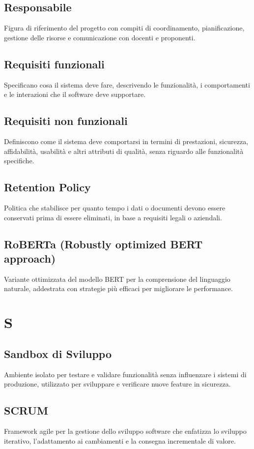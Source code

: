 \documentclass[a4paper,11pt]{article}
\begin{document}
\subsection{Responsabile}
Figura di riferimento del progetto con compiti di coordinamento, pianificazione, gestione delle risorse e comunicazione con docenti e proponenti.

\subsection{Requisiti funzionali}
Specificano cosa il sistema deve fare, descrivendo le funzionalità, i comportamenti e le interazioni che il software deve supportare.

\subsection{Requisiti non funzionali}
Definiscono come il sistema deve comportarsi in termini di prestazioni, sicurezza, affidabilità, usabilità e altri attributi di qualità, senza riguardo alle funzionalità specifiche.

\subsection{Retention Policy}
Politica che stabilisce per quanto tempo i dati o documenti devono essere conservati prima di essere eliminati, in base a requisiti legali o aziendali.

\subsection{RoBERTa (Robustly optimized BERT approach)}
Variante ottimizzata del modello BERT per la comprensione del linguaggio naturale, addestrata con strategie più efficaci per migliorare le performance.

\newpage
\section{S}

\subsection{Sandbox di Sviluppo}
Ambiente isolato per testare e validare funzionalità senza influenzare i sistemi di produzione, utilizzato per sviluppare e verificare nuove feature in sicurezza.

\subsection{SCRUM}
Framework agile per la gestione dello sviluppo software che enfatizza lo sviluppo iterativo, l'adattamento ai cambiamenti e la consegna incrementale di valore.
\end{document}
